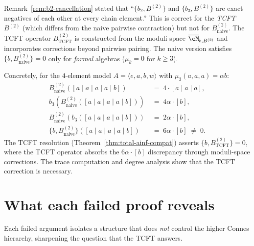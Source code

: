 \begin{remark}
\label{rem:b2-cancellation-correction}
Remark~\ref{rem:b2-cancellation} stated that
``$\{b_2, B^{(2)}\}$ and $\{b_3, B^{(2)}\}$ are exact negatives
of each other at every chain element.'' This is correct for
the \emph{TCFT} $B^{(2)}$ (which differs from the naive
pairwise contraction) but not for $B^{(2)}_{\mathrm{naive}}$.
The TCFT operator $B^{(2)}_{\mathrm{TCFT}}$ is constructed
from the moduli space $\overline{\cM}_{b, B^{(2)}}$ and
incorporates corrections beyond pairwise pairing. The naive
version satisfies $\{b, B^{(2)}_{\mathrm{naive}}\} = 0$ only
for \emph{formal} algebras ($\mu_k = 0$ for $k \geq 3$).

Concretely, for the $4$-element model
$A = \langle e, a, b, w \rangle$ with
$\mu_3(a,a,a) = \alpha b$:
\begin{align*}
 B^{(2)}_{\mathrm{naive}}([a \mid a \mid a \mid a \mid b])
 &\;=\; 4 \cdot [a \mid a \mid a], \\
 b_3(B^{(2)}_{\mathrm{naive}}([a \mid a \mid a \mid a \mid b]))
 &\;=\; 4\alpha \cdot [b], \\
 B^{(2)}_{\mathrm{naive}}(b_3([a \mid a \mid a \mid a \mid b]))
 &\;=\; 2\alpha \cdot [b], \\
 \{b, B^{(2)}_{\mathrm{naive}}\}
 ([a \mid a \mid a \mid a \mid b])
 &\;=\; 6\alpha \cdot [b] \;\neq\; 0.
\end{align*}
The TCFT resolution (Theorem~\ref{thm:total-ainf-compat})
asserts $\{b, B^{(2)}_{\mathrm{TCFT}}\} = 0$, where the TCFT
operator absorbs the $6\alpha \cdot [b]$ discrepancy through
moduli-space corrections.
The trace computation and degree analysis show that the TCFT correction
is necessary.
\end{remark}


\section{What each failed proof reveals}
\label{sec:m3b2-what-failures-reveal}

Each failed argument isolates a structure that does \emph{not}
control the higher Connes hierarchy, sharpening the question that
the TCFT answers.

